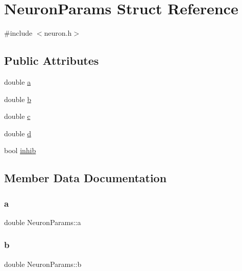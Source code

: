 \hypertarget{structNeuronParams}{}\section{Neuron\+Params Struct Reference}
\label{structNeuronParams}


{\ttfamily \#include $<$neuron.\+h$>$}

\subsection*{Public Attributes}
\begin{DoxyCompactItemize}
\item 
double \hyperlink{structNeuronParams_a359703733f5e70bbd67d019e45a3bc85}{a}
\item 
double \hyperlink{structNeuronParams_abd1bd37179d8efa115a8749f9252f77d}{b}
\item 
double \hyperlink{structNeuronParams_a5df2ced2526eb84af2c8d2d34d9bfd93}{c}
\item 
double \hyperlink{structNeuronParams_af2bd3bad3bc5532186cdc8d056a10cfb}{d}
\item 
bool \hyperlink{structNeuronParams_a751856d77a821cbd361b774d8653bbe6}{inhib}
\end{DoxyCompactItemize}


\subsection{Member Data Documentation}
\mbox{\label{structNeuronParams_a359703733f5e70bbd67d019e45a3bc85}} 
\subsubsection{\texorpdfstring{a}{a}}
{\footnotesize\ttfamily double Neuron\+Params\+::a}

\mbox{\label{structNeuronParams_abd1bd37179d8efa115a8749f9252f77d}} 
\subsubsection{\texorpdfstring{b}{b}}
{\footnotesize\ttfamily double Neuron\+Params\+::b}

